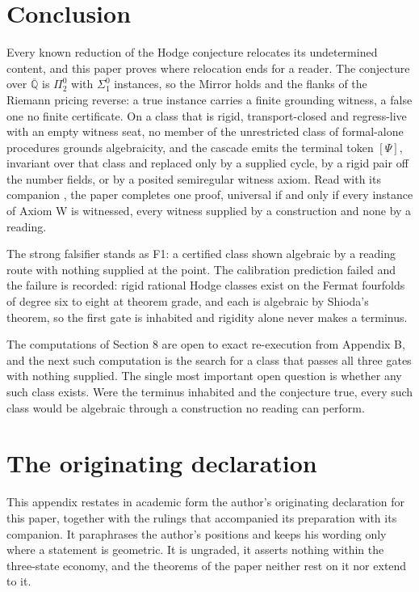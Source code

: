 \documentclass[10pt,twocolumn]{article}
\begin{document}
\hypertarget{conclusion}{%
\section{Conclusion}\label{conclusion}}

Every known reduction of the Hodge conjecture relocates its undetermined
content, and this paper proves where relocation ends for a reader. The
conjecture over \(\overline{\mathbb{Q}}\) is \(\Pi^0_2\) with
\(\Sigma^0_1\) instances, so the Mirror holds and the flanks of the
Riemann pricing reverse: a true instance carries a finite grounding
witness, a false one no finite certificate. On a class that is rigid,
transport-closed and regress-live with an empty witness seat, no member
of the unrestricted class of formal-alone procedures grounds
algebraicity, and the cascade emits the terminal token \([\Psi]\),
invariant over that class and replaced only by a supplied cycle, by a
rigid pair off the number fields, or by a posited semiregular witness
axiom. Read with its companion \cite{islam2026w}, the paper completes
one proof, universal if and only if every instance of Axiom W is
witnessed, every witness supplied by a construction and none by a
reading.

The strong falsifier stands as F1: a certified class shown algebraic by
a reading route with nothing supplied at the point. The calibration
prediction failed and the failure is recorded: rigid rational Hodge
classes exist on the Fermat fourfolds of degree six to eight at theorem
grade, and each is algebraic by Shioda's theorem, so the first gate is
inhabited and rigidity alone never makes a terminus.

The computations of Section 8 are open to exact re-execution from
Appendix B, and the next such computation is the search for a class that
passes all three gates with nothing supplied. The single most important
open question is whether any such class exists. Were the terminus
inhabited and the conjecture true, every such class would be algebraic
through a construction no reading can perform.

\appendix

\hypertarget{the-originating-declaration}{%
\section{The originating
declaration}\label{the-originating-declaration}}

This appendix restates in academic form the author's originating
declaration for this paper, together with the rulings that accompanied
its preparation with its companion. It paraphrases the author's
positions and keeps his wording only where a statement is geometric. It
is ungraded, it asserts nothing within the three-state economy, and the
theorems of the paper neither rest on it nor extend to it.
\end{document}
